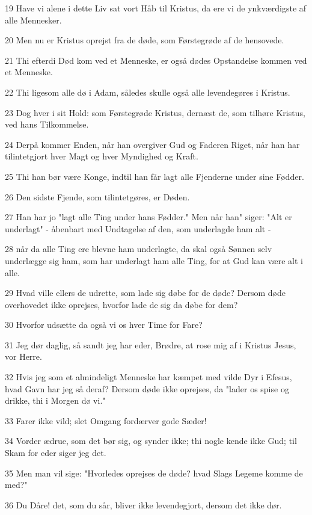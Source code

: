 \par 19 Have vi alene i dette Liv sat vort Håb til Kristus, da ere vi de ynkværdigste af alle Mennesker.
\par 20 Men nu er Kristus oprejst fra de døde, som Førstegrøde af de hensovede.
\par 21 Thi efterdi Død kom ved et Menneske, er også dødes Opstandelse kommen ved et Menneske.
\par 22 Thi ligesom alle dø i Adam, således skulle også alle levendegøres i Kristus.
\par 23 Dog hver i sit Hold: som Førstegrøde Kristus, dernæst de, som tilhøre Kristus, ved hans Tilkommelse.
\par 24 Derpå kommer Enden, når han overgiver Gud og Faderen Riget, når han har tilintetgjort hver Magt og hver Myndighed og Kraft.
\par 25 Thi han bør være Konge, indtil han får lagt alle Fjenderne under sine Fødder.
\par 26 Den sidste Fjende, som tilintetgøres, er Døden.
\par 27 Han har jo "lagt alle Ting under hans Fødder." Men når han" siger: "Alt er underlagt" - åbenbart med Undtagelse af den, som underlagde ham alt -
\par 28 når da alle Ting ere blevne ham underlagte, da skal også Sønnen selv underlægge sig ham, som har underlagt ham alle Ting, for at Gud kan være alt i alle.
\par 29 Hvad ville ellers de udrette, som lade sig døbe for de døde? Dersom døde overhovedet ikke oprejses, hvorfor lade de sig da døbe for dem?
\par 30 Hvorfor udsætte da også vi os hver Time for Fare?
\par 31 Jeg dør daglig, så sandt jeg har eder, Brødre, at rose mig af i Kristus Jesus, vor Herre.
\par 32 Hvis jeg som et almindeligt Menneske har kæmpet med vilde Dyr i Efesus, hvad Gavn har jeg så deraf? Dersom døde ikke oprejses, da "lader os spise og drikke, thi i Morgen dø vi."
\par 33 Farer ikke vild; slet Omgang fordærver gode Sæder!
\par 34 Vorder ædrue, som det bør sig, og synder ikke; thi nogle kende ikke Gud; til Skam for eder siger jeg det.
\par 35 Men man vil sige: "Hvorledes oprejses de døde? hvad Slags Legeme komme de med?"
\par 36 Du Dåre! det, som du sår, bliver ikke levendegjort, dersom det ikke dør.
